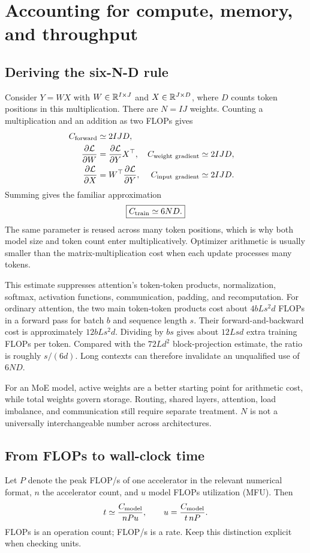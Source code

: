 \chapter{Accounting for compute, memory, and throughput}
\section{Deriving the six-N-D rule}
Consider $Y=WX$ with $W\in\mathbb R^{I\times J}$ and $X\in\mathbb R^{J\times D}$, where $D$ counts token positions in this multiplication. There are $N=IJ$ weights. Counting a multiplication and an addition as two FLOPs gives
\begin{align}
 C_{\rm forward}&\simeq2IJD,\\
 \frac{\partial\mathcal L}{\partial W}&=\frac{\partial\mathcal L}{\partial Y}X^\top,
 &C_{\rm weight\ gradient}&\simeq2IJD,\\
 \frac{\partial\mathcal L}{\partial X}&=W^\top\frac{\partial\mathcal L}{\partial Y},
 &C_{\rm input\ gradient}&\simeq2IJD.
\end{align}
Summing gives the familiar approximation
\begin{equation}\boxed{C_{\rm train}\simeq6ND.}\label{eq:6nd}\end{equation}
The same parameter is reused across many token positions, which is why both model size and token count enter multiplicatively. Optimizer arithmetic is usually smaller than the matrix-multiplication cost when each update processes many tokens.

This estimate suppresses attention's token-token products, normalization, softmax, activation functions, communication, padding, and recomputation. For ordinary attention, the two main token-token products cost about $4bLs^2d$ FLOPs in a forward pass for batch $b$ and sequence length $s$. Their forward-and-backward cost is approximately $12bLs^2d$. Dividing by $bs$ gives about $12Lsd$ extra training FLOPs per token. Compared with the $72Ld^2$ block-projection estimate, the ratio is roughly $s/(6d)$. Long contexts can therefore invalidate an unqualified use of $6ND$.

For an MoE model, active weights are a better starting point for arithmetic cost, while total weights govern storage. Routing, shared layers, attention, load imbalance, and communication still require separate treatment. $N$ is not a universally interchangeable number across architectures.

\section{From FLOPs to wall-clock time}
Let $P$ denote the peak FLOP/s of one accelerator in the relevant numerical format, $n$ the accelerator count, and $u$ model FLOPs utilization (MFU). Then
\begin{equation}
 t\simeq\frac{C_{\rm model}}{nPu},\qquad
 u=\frac{C_{\rm model}}{t\,nP}.
\end{equation}
FLOPs is an operation count; FLOP/s is a rate. Keep this distinction explicit when checking units.

